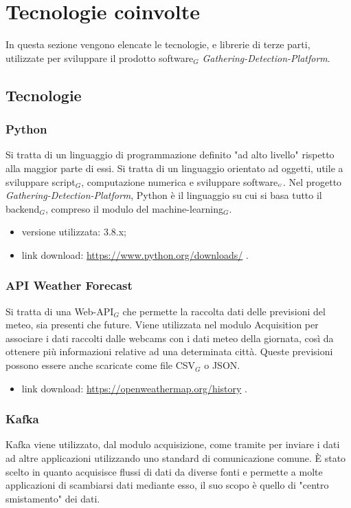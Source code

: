 \chapter{Tecnologie coinvolte}\label{TecnologieCoinvolte}
In questa sezione vengono elencate le tecnologie, e librerie di terze parti, utilizzate per sviluppare il prodotto software$_G$ \textit{Gathering-Detection-Platform}.

\section{Tecnologie}\label{Tecnologie}
\subsection{Python}\label{TecnologiePython}
Si tratta di un linguaggio di programmazione definito "ad alto livello" rispetto alla maggior parte di essi.
Si tratta di un linguaggio orientato ad oggetti, utile a sviluppare script$_G$, computazione numerica e sviluppare software$_{\scaleto{G}{3pt}}$.
Nel progetto \textit{Gathering-Detection-Platform}, Python è il linguaggio su cui si basa tutto il backend$_G$, compreso il modulo del machine-learning$_G$.

\begin{itemize}
  \item versione utilizzata: 3.8.x;
  \item link download: \url{https://www.python.org/downloads/} .
\end{itemize}

\subsection{API Weather Forecast}\label{APIWeatherForecast}
Si tratta di una Web-API$_G$ che permette la raccolta dati delle previsioni del meteo, sia presenti che future.
Viene utilizzata nel modulo Acquisition per associare i dati raccolti dalle webcams con i dati meteo della giornata, così da ottenere più informazioni relative ad una determinata città.
Queste previsioni possono essere anche scaricate come file CSV$_G$ o JSON.
\begin{itemize}
  \item link download: \url{https://openweathermap.org/history} .
\end{itemize}


\subsection{Kafka}\label{TecnologieKafka}
Kafka viene utilizzato, dal modulo acquisizione, come tramite per inviare i dati ad altre applicazioni utilizzando uno standard di comunicazione comune.
È stato scelto in quanto acquisisce flussi di dati da diverse fonti e permette a molte applicazioni di scambiarsi dati mediante esso, il suo scopo è quello di "centro smistamento" dei dati.

